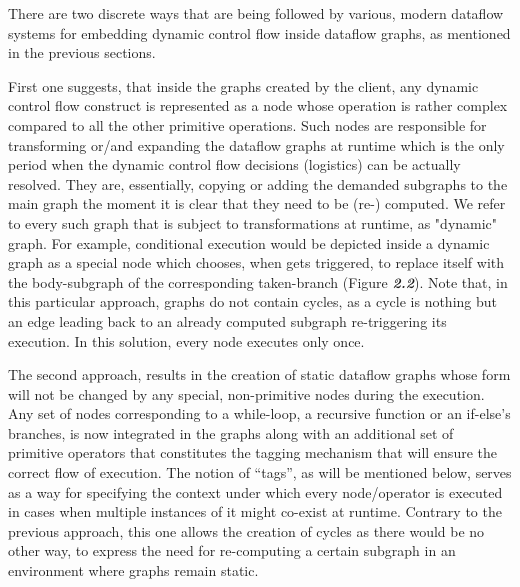 \documentclass[ack,preface]{dithesis}
\begin{document}
There are two discrete ways that are being followed by various, modern dataflow systems for embedding dynamic control flow inside dataflow graphs, as mentioned in the previous sections. 

First one suggests, that inside the graphs created by the client, any dynamic control flow construct is represented as a node whose operation is rather complex compared to all the other primitive operations. Such nodes are responsible for transforming or/and expanding the dataflow graphs at runtime which is the only period when the dynamic control flow decisions (logistics) can be actually resolved. They are, essentially, copying or adding the demanded subgraphs to the main graph the moment it is clear that they need to be (re-) computed. We refer to every such graph that is subject to transformations at runtime, as "dynamic" graph.  For example, conditional execution would be depicted inside a dynamic graph as a special node which chooses, when gets triggered, to replace itself with the body-subgraph of the corresponding taken-branch (Figure \textit{\textbf{2.2}}).
Note that, in this particular approach, graphs do not contain cycles, as a cycle is nothing but an edge leading back to an already computed subgraph re-triggering its execution. In this solution, every node executes only once. 

The second approach, results in the creation of static dataflow graphs whose form will not be changed by any special, non-primitive nodes during the execution. Any set of nodes corresponding to a while-loop, a recursive function or an if-else’s branches, is now integrated in the graphs along with an additional set of primitive operators that constitutes the tagging mechanism that will ensure the correct flow of execution. The notion of “tags”, as will be mentioned below, serves as a way for specifying the context under which every node/operator is executed in cases when multiple instances of it might co-exist at runtime. Contrary to the previous approach, this one allows the creation of cycles as there would be no other way, to express the need for re-computing a certain subgraph in an environment where graphs remain static. 
\end{document}
